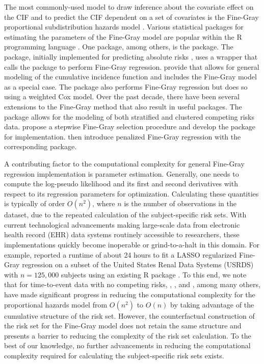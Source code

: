 The most commonly-used model to draw inference about the covariate effect on the CIF and to predict the CIF dependent on a set of covariates is the Fine-Gray proportional subdistribution hazards model \citep{fine1999proportional}. Various statistical packages for estimating the parameters of the Fine-Gray model are popular within the {R} programming language \citep{ihaka1996}. One package, among others, is the  package. The  package, initially implemented for predicting absolute risks \citep{gerds2012absolute}, uses a wrapper that calls the  package to perform Fine-Gray regression. \cite{scheike2011analyzing} provide  that allows for general modeling of the cumulative incidence function and includes the Fine-Gray model as a special case. The  package also performs Fine-Gray regression but does so using a weighted Cox \citep{cox1972regression} model. Over the past decade, there have been several extensions to the Fine-Gray method that also result in useful packages. The  package allows for the modeling of both stratified \citep{zhou2011competing} and clustered \citep{zhou2012competing} competing risks data. \cite{kuk2013model} propose a  stepwise Fine-Gray selection procedure and develop the  package for implementation. \cite{fu2017penalized} then introduce penalized Fine-Gray regression with the corresponding  package. 

A contributing factor to the computational complexity for general Fine-Gray regression implementation is parameter estimation. Generally, one needs to compute the log-pseudo likelihood and its first and second derivatives with respect to its regression parameters for optimization. Calculating these quantities is typically of order $O(n^2)$, where $n$ is the number of observations in the dataset, due to the repeated calculation of the subject-specific risk sets. With current technological advancements making large-scale data from  electronic health record (EHR) data systems routinely accessible to researchers, these implementations quickly become inoperable or grind-to-a-halt in this domain. 
 For example, \cite{kawaguchi2019scalable} reported a runtime of about 24 hours to fit a LASSO
regularized Fine-Gray regression
 on a subset of the United States Renal Data Systems (USRDS) with $n =125, 000$
subjects using an existing R package
.
To this end, we note that for time-to-event data with no competing risks, \cite{simon2011regularization}, \cite{breheny2011coordinate}, and \cite{ mittal2013high}, among many others, have made significant progress in reducing the computational complexity for the \cite{cox1972regression} proportional hazards model from $O(n^2)$ to $O(n)$ by taking advantage of the cumulative structure of the risk set. However, the counterfactual construction of the risk set for the Fine-Gray model does not retain the same structure and presents a barrier to reducing the complexity of the risk set calculation. To the best of our knowledge, no further advancements in reducing the computational complexity required for calculating the subject-specific risk sets exists. 

